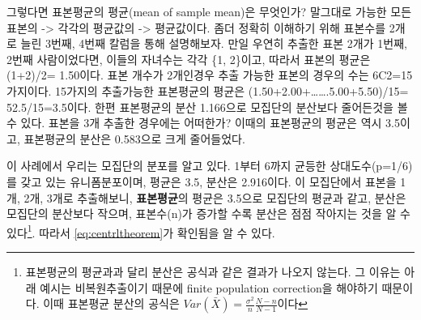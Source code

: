 \documentclass[
]{book}
\begin{document}
그렇다면 표본평균의 평균(mean of sample mean)은 무엇인가? 말그대로 가능한 모든 표본의 -\textgreater{} 각각의 평균값의 -\textgreater{} 평균값이다. 좀더 정확히 이해하기 위해 표본수를 2개로 늘린 3번째, 4번째 칼럼을 통해 설명해보자. 만일 우연히 추출한 표본 2개가 1번째, 2번째 사람이었다면, 이들의 자녀수는 각각 \{1, 2\}이고, 따라서 표본의 평균은 (1+2)/2= 1.50이다. 표본 개수가 2개인경우 추출 가능한 표본의 경우의 수는 6C2=15가지이다. 15가지의 추출가능한 표본평균의 평균은 (1.50+2.00+\ldots\ldots.5.00+5.50)/15= 52.5/15=3.5이다. 한편 표본평균의 분산 1.166으로 모집단의 분산보다 줄어든것을 볼 수 있다.
표본을 3개 추출한 경우에는 어떠한가? 이때의 표본평균의 평균은 역시 3.5이고, 표본평균의 분산은 0.583으로 크게 줄어들었다.

이 사례에서 우리는 모집단의 분포를 알고 있다. 1부터 6까지 균등한 상대도수(p=1/6)를 갖고 있는 유니폼분포이며, 평균은 3.5, 분산은 2.916이다. 이 모집단에서 표본을 1개, 2개, 3개로 추출해보니, \textbf{표본평균}의 평균은 3.5으로 모집단의 평균과 같고, 분산은 모집단의 분산보다 작으며, 표본수(n)가 증가할 수록 분산은 점점 작아지는 것을 알 수 있다\footnote{표본평균의 평균과과 달리 분산은 공식과 같은 결과가 나오지 않는다. 그 이유는 아래 예시는 비복원추출이기 때문에 finite population correction을 해야하기 때문이다. 이때 표본평균 분산의 공식은 \(Var(\bar X)=\frac{\sigma^2}{n}\frac{N-n}{N-1}\)이다}. 따라서 \eqref{eq:centrltheorem}가 확인됨을 알 수 있다.
\end{document}
